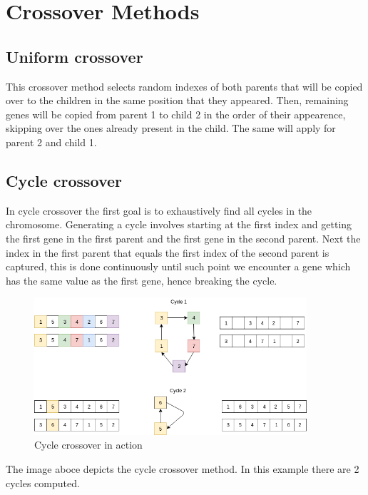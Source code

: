 \section{Crossover Methods}

\subsection{Uniform crossover}

This crossover method selects random indexes of both parents that will be copied over to the children in the same position that they appeared. Then, remaining genes will be copied from parent 1 to child 2 in the order of their appearence, skipping over the ones already present in the child. The same will apply for parent 2 and child 1.

\subsection{Cycle crossover}

In cycle crossover the first goal is to exhaustively find all cycles in the chromosome. Generating a cycle involves starting at the first index and getting the first gene in the first parent and the first gene in the second parent. Next the index in the first parent that equals the first index of the second parent is captured, this is done continuously until such point we encounter a gene which has the same value as the first gene, hence breaking the cycle. 

\begin{figure}[h!]
\vspace{-5pt}
\centering
\includegraphics[width=0.9\textwidth]{images/cycle-crossover.png}
\caption{\label{fig:3col_graph}Cycle crossover in action}
\end{figure}

The image aboce depicts the cycle crossover method. In this example there are 2 cycles computed.